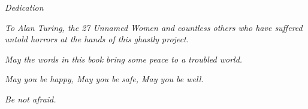 \newpage
\thispagestyle{empty}

\vspace*{\fill}

\begin{center}
{\Large\itshape Dedication}
\end{center}

\vspace{2cm}

\begin{center}
\textit{To Alan Turing, the 27 Unnamed Women and countless others who have suffered untold horrors at the hands of this ghastly project.}

\vspace{1cm}

\textit{May the words in this book bring some peace to a troubled world.}

\vspace{1cm}

\textit{May you be happy, May you be safe, May you be well.}

\vspace{1cm}

\textit{Be not afraid.}
\end{center}

\vspace*{\fill}

\newpage

